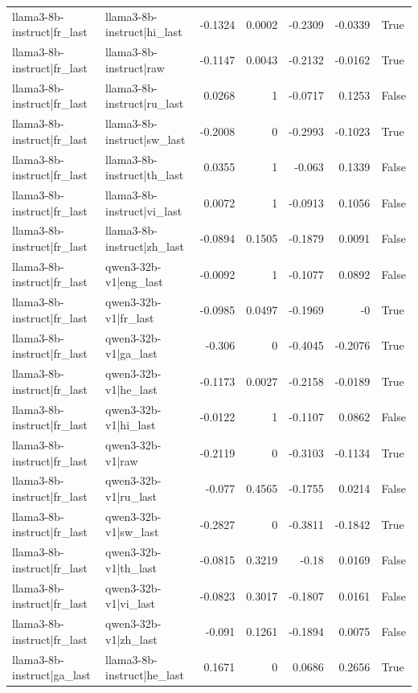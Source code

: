 \begin{table}
\begin{tabular}{l l r r r r l}
llama3-8b-instruct|fr_last & llama3-8b-instruct|hi_last & -0.1324 & 0.0002 & -0.2309 & -0.0339 & True \\
llama3-8b-instruct|fr_last & llama3-8b-instruct|raw & -0.1147 & 0.0043 & -0.2132 & -0.0162 & True \\
llama3-8b-instruct|fr_last & llama3-8b-instruct|ru_last & 0.0268 & 1 & -0.0717 & 0.1253 & False \\
llama3-8b-instruct|fr_last & llama3-8b-instruct|sw_last & -0.2008 & 0 & -0.2993 & -0.1023 & True \\
llama3-8b-instruct|fr_last & llama3-8b-instruct|th_last & 0.0355 & 1 & -0.063 & 0.1339 & False \\
llama3-8b-instruct|fr_last & llama3-8b-instruct|vi_last & 0.0072 & 1 & -0.0913 & 0.1056 & False \\
llama3-8b-instruct|fr_last & llama3-8b-instruct|zh_last & -0.0894 & 0.1505 & -0.1879 & 0.0091 & False \\
llama3-8b-instruct|fr_last & qwen3-32b-v1|eng_last & -0.0092 & 1 & -0.1077 & 0.0892 & False \\
llama3-8b-instruct|fr_last & qwen3-32b-v1|fr_last & -0.0985 & 0.0497 & -0.1969 & -0 & True \\
llama3-8b-instruct|fr_last & qwen3-32b-v1|ga_last & -0.306 & 0 & -0.4045 & -0.2076 & True \\
llama3-8b-instruct|fr_last & qwen3-32b-v1|he_last & -0.1173 & 0.0027 & -0.2158 & -0.0189 & True \\
llama3-8b-instruct|fr_last & qwen3-32b-v1|hi_last & -0.0122 & 1 & -0.1107 & 0.0862 & False \\
llama3-8b-instruct|fr_last & qwen3-32b-v1|raw & -0.2119 & 0 & -0.3103 & -0.1134 & True \\
llama3-8b-instruct|fr_last & qwen3-32b-v1|ru_last & -0.077 & 0.4565 & -0.1755 & 0.0214 & False \\
llama3-8b-instruct|fr_last & qwen3-32b-v1|sw_last & -0.2827 & 0 & -0.3811 & -0.1842 & True \\
llama3-8b-instruct|fr_last & qwen3-32b-v1|th_last & -0.0815 & 0.3219 & -0.18 & 0.0169 & False \\
llama3-8b-instruct|fr_last & qwen3-32b-v1|vi_last & -0.0823 & 0.3017 & -0.1807 & 0.0161 & False \\
llama3-8b-instruct|fr_last & qwen3-32b-v1|zh_last & -0.091 & 0.1261 & -0.1894 & 0.0075 & False \\
llama3-8b-instruct|ga_last & llama3-8b-instruct|he_last & 0.1671 & 0 & 0.0686 & 0.2656 & True \\

\end{tabular}
\end{table}
